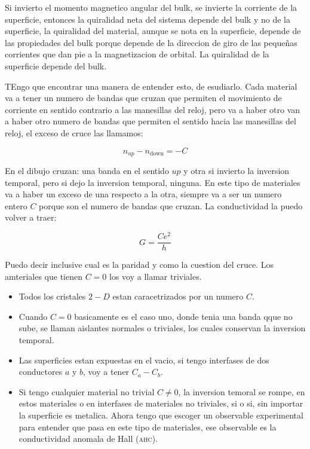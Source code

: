 \documentclass[11pt,fleqn]{book}
\begin{document}

Si invierto el momento magnetico angular del bulk, se invierte la corriente de la superficie, entonces la quiralidad neta del sistema depende del bulk y no de la superficie, la quiralidad del material, aunque se nota en la superficie, depende de las propiedades del bulk porque depende de la direccion de giro de las pequeñas corrientes que dan pie a la magnetizacion de orbital. La quiralidad de la superficie depende del bulk.

TEngo que encontrar una manera de entender esto, de esudiarlo. Cada material va a tener un numero de bandas que cruzan que permiten el movimiento de corriente en sentido contrario a las manesillas del reloj, pero va a haber otro van a haber otro numero de bandas que permiten el sentido hacia las manesillas del reloj, el exceso de cruce las llamamos:

\begin{equation}
    n_{up}-n_{\text{down}}=-C
\end{equation}

En el dibujo cruzan: una banda en el sentido $up$ y otra si invierto la inversion temporal, pero si dejo la inversion temporal, ninguna. En este tipo de materiales va a haber un exceso de una respecto a la otra, siempre va a ser un numero entero $C$ porque son el numero de bandas que cruzan. La conductividad la puedo volver a traer:

\begin{equation}
    G=\frac{Ce^{2}}{h}
\end{equation}

Puedo decir inclusive cual es la paridad y como la cuestion del cruce. Los amteriales  que tienen $C=0$ los voy a llamar triviales.

\begin{itemize}
    \item Todos los cristales $2-D$ estan caracetrizados por un numero $C$.
    \item Cuando $C=0$ basicamente es el caso uno, donde tenia una banda qque no sube, se llaman aislantes normales o triviales, los cuales conservan la inversion temporal.
    \item Las superficies estan expuestas en el vacio, si tengo interfases de dos conductores $a$ y $b$, voy a tener $C_{a}-C_{b}$.
    \item Si tengo cualquier material no trivial $C\neq0$, la inversion temoral se rompe, en estos materiales o en interfases de materiales no triviales, si o si, sin importar la superficie es metalica. Ahora tengo que escoger un observable experimental para entender que pasa en este tipo de materiales, ese observable es la conductividad anomala de Hall (\textsc{ahc}).
  
\end{itemize}
\end{document}

